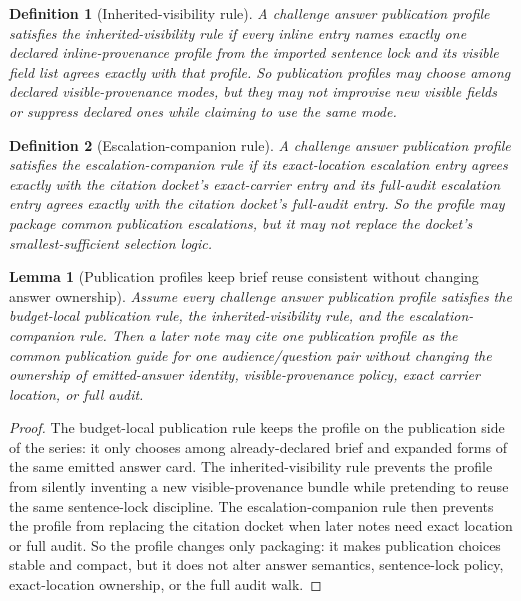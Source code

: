\documentclass[11pt]{article}
\newtheorem{definition}{Definition}
\newtheorem{lemma}{Lemma}
\begin{document}
\begin{definition}[Inherited-visibility rule]
A challenge answer publication profile satisfies the \emph{inherited-visibility rule} if every inline entry names exactly one declared inline-provenance profile from the imported sentence lock and its visible field list agrees exactly with that profile.
So publication profiles may choose among declared visible-provenance modes, but they may not improvise new visible fields or suppress declared ones while claiming to use the same mode.
\end{definition}

\begin{definition}[Escalation-companion rule]
A challenge answer publication profile satisfies the \emph{escalation-companion rule} if its exact-location escalation entry agrees exactly with the citation docket's exact-carrier entry and its full-audit escalation entry agrees exactly with the citation docket's full-audit entry.
So the profile may package common publication escalations, but it may not replace the docket's smallest-sufficient selection logic.
\end{definition}

\begin{lemma}[Publication profiles keep brief reuse consistent without changing answer ownership]
Assume every challenge answer publication profile satisfies the budget-local publication rule, the inherited-visibility rule, and the escalation-companion rule.
Then a later note may cite one publication profile as the common publication guide for one audience/question pair without changing the ownership of emitted-answer identity, visible-provenance policy, exact carrier location, or full audit.
\end{lemma}

\begin{proof}
The budget-local publication rule keeps the profile on the publication side of the series: it only chooses among already-declared brief and expanded forms of the same emitted answer card.
The inherited-visibility rule prevents the profile from silently inventing a new visible-provenance bundle while pretending to reuse the same sentence-lock discipline.
The escalation-companion rule then prevents the profile from replacing the citation docket when later notes need exact location or full audit.
So the profile changes only packaging: it makes publication choices stable and compact, but it does not alter answer semantics, sentence-lock policy, exact-location ownership, or the full audit walk.\qedhere
\end{proof}
\end{document}
